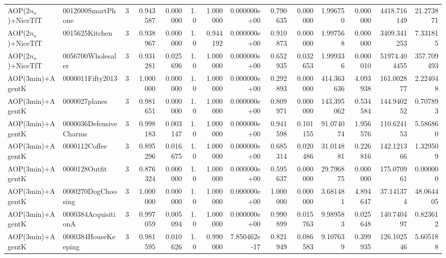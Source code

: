 \begin{tabular}{llrr|r|rr|rr|rr|rrr}
     AOP($2 n_o$)+NiceTfT &      0012000SmartPhone &       3 & 0.943587 & 0.000000 &  1.0 &      1.000000 & 0.000000e+00 &      0.790635 & 0.000000 &      1.996750 &    0.000000 &  4418.716149 &   21.273871 \\
     AOP($2 n_o$)+NiceTfT &         0015625Kitchen &       3 & 0.938967 & 0.000000 &  1.0 &      0.944192 & 0.000000e+00 &      0.910873 & 0.000000 &      1.997568 &    0.000000 &  3409.341253 &    7.331815 \\
     AOP($2 n_o$)+NiceTfT &      0056700Wholesaler &       3 & 0.931281 & 0.025696 &  1.0 &      1.000000 & 0.000000e+00 &      0.652935 & 0.032653 &      1.999336 &    0.000010 & 51974.404455 &  357.709493 \\
         AOP(3min)+AgentK &       0000011Fifty2013 &       3 & 1.000000 & 0.000000 &  1.0 &      1.000000 & 0.000000e+00 &      0.292893 & 0.000000 &    414.363636 &    4.093938 &   161.002877 &    2.224048 \\
         AOP(3min)+AgentK &          0000027planes &       3 & 0.981651 & 0.000000 &  1.0 &      1.000000 & 0.000000e+00 &      0.809971 & 0.000000 &    143.395062 &    0.534584 &   144.940252 &    0.707893 \\
         AOP(3min)+AgentK & 0000036DefensiveCharms &       3 & 0.998183 & 0.003147 &  1.0 &      1.000000 & 0.000000e+00 &      0.941598 & 0.101155 &     91.074074 &    1.956576 &   110.624153 &    5.586860 \\
         AOP(3min)+AgentK &          0000112Coffee &       3 & 0.895296 & 0.016675 &  1.0 &      1.000000 & 0.000000e+00 &      0.685314 & 0.020486 &     31.014881 &    0.226816 &   142.121366 &    1.329509 \\
         AOP(3min)+AgentK &          0000128Outfit &       3 & 0.876324 & 0.000000 &  1.0 &      1.000000 & 0.000000e+00 &      0.595637 & 0.000000 &     29.796875 &    0.000000 &   175.070961 &    0.000000 \\
         AOP(3min)+AgentK &     0000270DogChoosing &       3 & 1.000000 & 0.000000 &  1.0 &      1.000000 & 0.000000e+00 &      1.000000 & 0.000000 &      3.681481 &    4.894647 &    37.141374 &   48.064405 \\
         AOP(3min)+AgentK &    0000384AcquisitionA &       3 & 0.997059 & 0.005094 &  1.0 &      1.000000 & 0.000000e+00 &      0.990899 & 0.015763 &      9.989583 &    0.025648 &   140.740497 &    0.823612 \\
         AOP(3min)+AgentK &    0000384HouseKeeping &       3 & 0.981595 & 0.010626 &  1.0 &      0.990000 & 7.850462e-17 &      0.821949 & 0.086583 &      9.107639 &    0.399935 &   126.102546 &    5.605188 \\

\end{tabular}
